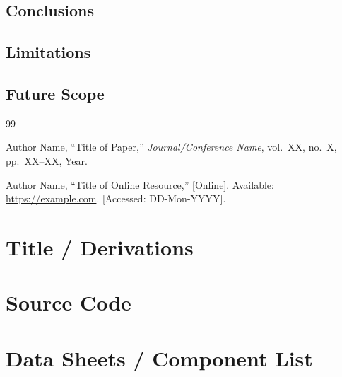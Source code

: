 \documentclass[12pt,a4paper]{report}
\numberwithin{equation}{chapter}
\begin{document}
\section{Conclusions}

\section{Limitations}

\section{Future Scope}

\renewcommand{\bibname}{\centering References}
\begin{thebibliography}{99}

Author Name, ``Title of Paper,'' \textit{Journal/Conference Name}, vol.~XX, no.~X,
pp.~XX--XX, Year.

Author Name, ``Title of Online Resource,'' [Online].
Available: \url{https://example.com}. [Accessed: DD-Mon-YYYY].

\end{thebibliography}

\appendix

\chapter{Title / Derivations}
\label{app:derivations}

\chapter{Source Code}
\label{app:code}

\chapter{Data Sheets / Component List}
\label{app:datasheets}
\end{document}
